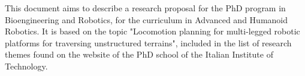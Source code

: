 \documentclass[../main.tex]{subfiles}
\begin{document}
This document aims to describe a research proposal for the PhD program in Bioengineering and Robotics, for the curriculum in Advanced and Humanoid Robotics. It is based on the topic "Locomotion planning for multi-legged robotic platforms for traversing unstructured terrains", included in the list of research themes found on the website of the PhD school of the Italian Institute of Technology. 
\end{document}
